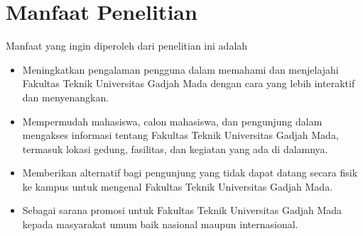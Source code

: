 


		

\section{Manfaat Penelitian}

Manfaat yang ingin diperoleh dari penelitian ini adalah

\begin{itemize}
	\item Meningkatkan pengalaman pengguna dalam memahami dan menjelajahi Fakultas Teknik Universitas Gadjah Mada dengan cara yang lebih interaktif dan menyenangkan.
	\item Mempermudah mahasiswa, calon mahasiswa, dan pengunjung dalam mengakses informasi tentang Fakultas Teknik Universitas Gadjah Mada, termasuk lokasi gedung, fasilitas, dan kegiatan yang ada di dalamnya.
	\item Memberikan alternatif bagi pengunjung yang tidak dapat datang secara fisik ke kampus untuk mengenal Fakultas Teknik Universitas Gadjah Mada.
	\item Sebagai sarana promosi untuk Fakultas Teknik Universitas Gadjah Mada kepada masyarakat umum baik nasional maupun internasional.
	\end{itemize}

